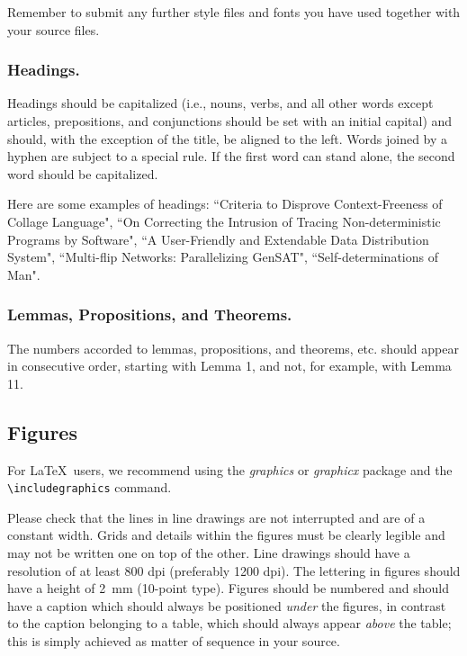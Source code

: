 \documentclass[lnicst,sechang,a4paper]{svmultln}
\begin{document}
Remember to submit any further style files and
fonts you have used together with your source files.

\subsubsection{Headings.}

Headings should be capitalized
(i.e., nouns, verbs, and all other words
except articles, prepositions, and conjunctions should be set with an
initial capital) and should,
with the exception of the title, be aligned to the left.
Words joined by a hyphen are subject to a special rule. If the first
word can stand alone, the second word should be capitalized.

Here are some examples of headings: ``Criteria to Disprove
Context-Freeness of Collage Language", ``On Correcting the Intrusion of
Tracing Non-deterministic Programs by Software", ``A User-Friendly and
Extendable Data Distribution System", ``Multi-flip Networks:
Parallelizing GenSAT", ``Self-determinations of Man".

\subsubsection{Lemmas, Propositions, and Theorems.}

The numbers accorded to lemmas, propositions, and theorems, etc. should
appear in consecutive order, starting with Lemma 1, and not, for
example, with Lemma 11.

\subsection{Figures}

For \LaTeX\ users, we recommend using the \emph{graphics} or \emph{graphicx}
package and the \verb+\includegraphics+ command.

Please check that the lines in line drawings are not
interrupted and are of a constant width. Grids and details within the
figures must be clearly legible and may not be written one on top of
the other. Line drawings should have a resolution of at least 800 dpi
(preferably 1200 dpi). The lettering in figures should have a height of
2~mm (10-point type). Figures should be numbered and should have a
caption which should always be positioned \emph{under} the figures, in
contrast to the caption belonging to a table, which should always appear
\emph{above} the table; this is simply achieved as matter of sequence in
your source.
\end{document}
